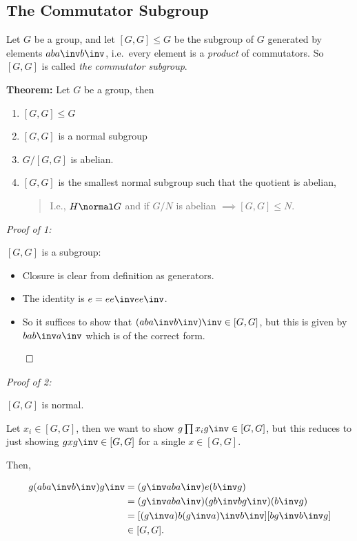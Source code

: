 \hypertarget{the-commutator-subgroup}{%
\subsection{The Commutator Subgroup}\label{the-commutator-subgroup}}

Let \(G\) be a group, and let \([G, G] \leq G\) be the subgroup of \(G\)
generated by elements \(aba\inv b\inv\), i.e.~every element is a
\emph{product} of commutators. So \([G, G]\) is called \emph{the
commutator subgroup}.

\textbf{Theorem:} Let \(G\) be a group, then

\begin{enumerate}
\def\labelenumi{\arabic{enumi}.}
\item
  \([G,G] \leq G\)
\item
  \([G,G]\) is a normal subgroup
\item
  \(G/[G, G]\) is abelian.
\item
  \([G,G]\) is the smallest normal subgroup such that the quotient is
  abelian,

  \begin{quote}
  I.e., \(H \normal G\) and if \(G/N\) is abelian
  \(\implies [G, G] \leq N\).
  \end{quote}
\end{enumerate}

\emph{Proof of 1:}

\([G, G]\) is a subgroup:

\begin{itemize}
\tightlist
\item
  Closure is clear from definition as generators.
\item
  The identity is \(e = e e\inv e e\inv\).
\item
  So it suffices to show that \((aba\inv b\inv)\inv \in [G, G]\), but
  this is given by \(bab\inv a\inv\) which is of the correct form.
\end{itemize}

\(\qed\)

\emph{Proof of 2:}

\([G, G]\) is normal.

Let \(x_i \in [G, G]\), then we want to show
\(g \prod x_i g\inv \in [G, G]\), but this reduces to just showing
\(gx g\inv \in [G, G]\) for a single \(x\in [G, G]\).

Then,

\begin{align*}
g(aba\inv b\inv ) g\inv &= (g\inv aba\inv) e (b\inv g) \\
&= (g\inv aba\inv)(gb\inv b g\inv)(b\inv g) \\
&= [(g\inv a)b (g\inv a)\inv b\inv] [bg\inv b\inv g] \\
&\in [G, G]
.\end{align*}

